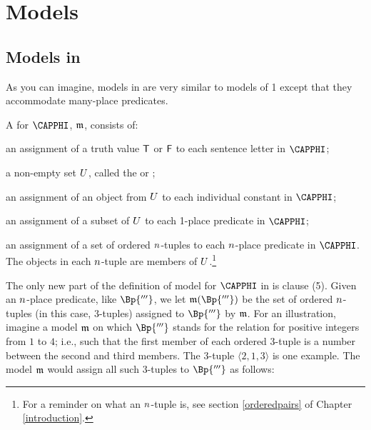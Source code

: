 \section{Models}\label{GQL Interpretations}

\subsection{Models in \GQL{}}\label{Interpretations in GQL}
As you can imagine, models in \GQL{} are very similar to models of \GQL{}1 except that they accommodate many-place predicates.

\begin{majorILnc}{} 
	A  for $\CAPPHI$, $\mathfrak{m}$, consists of:
	\begin{cenumerate}
		\item an assignment of a truth value $\mathsf{T}$ or $\mathsf{F}$ to each sentence letter in $\CAPPHI$; 
		\item a non-empty set $U$, called the  or ;
		\item an assignment of an object from $U$ to each individual constant in $\CAPPHI$;
		\item an assignment of a subset of $U$ to each 1-place predicate in $\CAPPHI$;
		\item an assignment of a set of ordered $n$-tuples to each $n$-place predicate in $\CAPPHI$.  The objects in each $n$-tuple are members of $U$.\footnote{For a reminder on what an $n$-tuple is, see section \ref{orderedpairs} of Chapter \ref{introduction}.}
	\end{cenumerate}
\end{majorILnc}

\noindent{}The only new part of the definition of model for $\CAPPHI$ in \GQL{} is clause (5).  
Given an $n$-place predicate, like $\Bp{'''}$, we let $\IntA(\Bp{'''})$ be the set of ordered $n$-tuples (in this case, $3$-tuples) assigned to $\Bp{'''}$ by $\mathfrak{m}$. 
For an illustration, imagine a model $\mathfrak{m}$ on which $\Bp{'''}$ stands for the  relation for positive integers from $1$ to $4$; i.e., such that the first member of each ordered $3$-tuple is a number between the second and third members.  The $3$-tuple $\langle 2, 1, 3\rangle$ is one example.  The model $\mathfrak{m}$ would assign all such $3$-tuples to $\Bp{'''}$ as follows:

